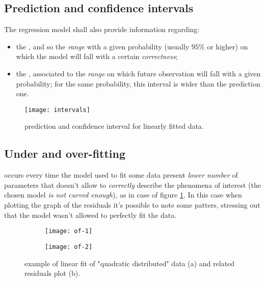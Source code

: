 	
\subsection{Prediction and confidence intervals}
	The regression model shall also provide information regarding:
	\begin{itemize}
		\item the , and so the \textit{range} with a given probability (usually $95\%$ or higher) on which the model will fall with a certain \textit{correctness};
		
		\item the , associated to the \textit{range} on which future observation will fall with a given probability; for the same probability, this interval is wider than the prediction one. 
	\end{itemize}
	\begin{SCfigure}[2][bht]
		\centering
		\texttt{[image: intervals]}
		\caption{prediction and confidence interval for linearly fitted data.}
	\end{SCfigure}
	
\subsection{Under and over-fitting}
	
	 occurs every time the model used to fit some data present \textit{lower number} of parameters that doesn't allow to \textit{correctly} describe the phenomena of interest (the chosen model \textit{is not curved enough}), as in case of figure \ref{fig:meas:underfit}. In this case when plotting the graph of the residuals it's possible to note some patters, stressing out that the model wasn't allowed to perfectly fit the data.
	
	\begin{figure}[bht]
		\centering
		\begin{subfigure}{0.48\linewidth}
			\centering 
			\texttt{[image: of-1]} \caption{}
		\end{subfigure}
		\begin{subfigure}{0.48\linewidth}
			\centering 
			\texttt{[image: of-2]} \caption{}
		\end{subfigure}
		\caption{example of linear fit of "quadratic distributed" data (a) and related residuals plot (b).} \label{fig:meas:underfit}
	\end{figure}
	
